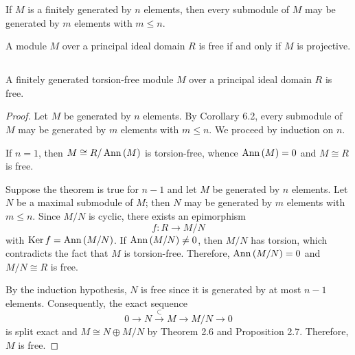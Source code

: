 \begin{corollary}
    If $M$ is a finitely generated by $n$ elements, then every submodule of $M$ may be generated by $m$ elements with $m \leq n$.
\end{corollary}

\begin{corollary}
    A module $M$ over a principal ideal domain $R$ is free if and only if $M$ is projective.
\end{corollary}


\subsection{}
\begin{theorem}
    A finitely generated torsion-free module $M$ over a principal ideal domain $R$ is free.
    \begin{proof}
        Let $M$ be generated by $n$ elements.
        By Corollary 6.2, every submodule of $M$ may be generated by $m$ elements with $m \leq n$.
        We proceed by induction on $n$.

        If $n=1$, then $M \cong R / \operatorname{\operatorname{Ann}}\left(M\right)$ is torsion-free, whence $\operatorname{\operatorname{Ann}}\left(M\right)=0$ and $M \cong R$ is free.

        Suppose the theorem is true for $n-1$ and let $M$ be generated by $n$ elements.
        Let $N$ be a maximal submodule of $M$; then $N$ may be generated by $m$ elements with $m \leq n$.
        Since $M / N$ is cyclic, there exists an epimorphism
        \begin{equation*}
            f: R \rightarrow M / N
        \end{equation*}
        with $\operatorname{\operatorname{Ker}} f=\operatorname{\operatorname{Ann}}\left(M / N\right)$.
        If $\operatorname{\operatorname{Ann}}\left(M / N\right) \neq 0$, then $M / N$ has torsion, which contradicts the fact that $M$ is torsion-free. Therefore, $\operatorname{\operatorname{Ann}}\left(M / N\right)=0$ and $M / N \cong R$ is free.

        By the induction hypothesis, $N$ is free since it is generated by at most $n-1$ elements.
        Consequently, the exact sequence
        \begin{equation*}
            0 \rightarrow N \xrightarrow{\subset} M \rightarrow M / N \rightarrow 0
        \end{equation*}
        is split exact and $M \cong N \oplus M / N$ by Theorem 2.6 and Proposition 2.7.
        Therefore, $M$ is free.
    \end{proof}
\end{theorem}

